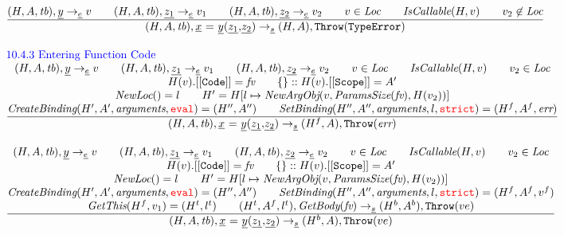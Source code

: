 \documentclass[a4paper, leqno]{amsart}
\newcommand{\rulesep}{\quad\quad}
\newcommand{\stmt}{s}
\newcommand{\expr}{e}
\newcommand{\ir}[1]{\ensuremath{\underline{#1}}}
\newcommand{\irid}{\ir{x}}
\def\inred{\color{red}}
\def\inblue{\color{blue}}
\newcommand{\strict}{{\inred\tt strict}}
\newcommand{\eval}{{\inred\tt eval}}
\newcommand{\tb}{\emph{tb}}
\newcommand{\err}{\emph{err}}
\newcommand{\te}{{\tt TypeError}}
\newcommand{\Loc}{\emph{Loc}}
\newcommand{\hf}[1]{\emph{#1}}
\newcommand{\error}{\ensuremath{{\tt Throw}(\err)}}
\newcommand{\thte}{\ensuremath{{\tt Throw}(\te)}}
\newcommand{\state}{\ensuremath{(H,A,\tb)}}
\newcommand{\res}{\ensuremath{(H,A)}}
\newcommand{\respp}{\ensuremath{(H'',A'')}}
\newcommand{\evale}{\ensuremath{(H,A,\tb)}}
\newcommand{\ircall}{\ensuremath{\irid \ {\tt =} \ \ir{y}{\tt(}\ir{z_1}{\tt,}\ir{z_2}{\tt)}}}
\def\inred{\color{red}}
\def\inblue{\color{blue}}
\begin{document}
\[\begin{array}{l@{~~}l@{~~}ll}
\frac{\begin{matrix}
\evale, \ir{y} \rightarrow_{\ir\expr} v
\rulesep
\evale, \ir{z_1} \rightarrow_{\ir\expr} v_1
\rulesep
\evale, \ir{z_2} \rightarrow_{\ir\expr} v_2
\rulesep
v \in \Loc
\rulesep
\hf{IsCallable}(H,v)
\rulesep
v_2 \not\in \Loc
\end{matrix}}{\begin{matrix}
\state, \ircall \rightarrow_{\ir\stmt}
\res, \thte
\end{matrix}}
\\[2em]

\mbox{\inblue 10.4.3 Entering Function Code}\\
\frac{\begin{matrix}
\evale, \ir{y} \rightarrow_{\ir\expr} v
\rulesep
\evale, \ir{z_1} \rightarrow_{\ir\expr} v_1
\rulesep
\evale, \ir{z_2} \rightarrow_{\ir\expr} v_2
\rulesep
v \in \Loc
\rulesep
\hf{IsCallable}(H,v)
\rulesep
v_2 \in \Loc
\\
H(v).{\tt[[Code]]} = \emph{fv}
\rulesep
\{\}::H(v).{\tt[[Scope]]} = A'
\\
\hf{NewLoc}() = l
\rulesep
H' = H[l\mapsto \hf{NewArgObj}(v, \hf{ParamsSize}(\emph{fv}), H(v_2))]
\\
\hf{CreateBinding}(H', A', \hf{arguments}, \eval) = \respp%
\rulesep
\hf{SetBinding}(H'', A'', \hf{arguments}, l, \strict) = (H^f, A^f, \err)%
\end{matrix}}{\begin{matrix}
\state, \ircall \rightarrow_{\ir\stmt}
(H^f, A), \error
\end{matrix}}
\\[2em]

\frac{\begin{matrix}
\evale, \ir{y} \rightarrow_{\ir\expr} v
\rulesep
\evale, \ir{z_1} \rightarrow_{\ir\expr} v_1
\rulesep
\evale, \ir{z_2} \rightarrow_{\ir\expr} v_2
\rulesep
v \in \Loc
\rulesep
\hf{IsCallable}(H,v)
\rulesep
v_2 \in \Loc
\\
H(v).{\tt[[Code]]} = \emph{fv}
\rulesep
\{\}::H(v).{\tt[[Scope]]} = A'
\\
\hf{NewLoc}() = l
\rulesep
H' = H[l\mapsto \hf{NewArgObj}(v, \hf{ParamsSize}(\emph{fv}), H(v_2))]
\\
\hf{CreateBinding}(H', A', \hf{arguments}, \eval) = \respp%
\rulesep
\hf{SetBinding}(H'', A'', \hf{arguments}, l, \strict) = (H^f, A^f, v^f)%
\\
\hf{GetThis}(H^f,v_1) = (H^t,l^t)
\rulesep
(H^t, A^f, l^t), \hf{GetBody}(\emph{fv}) \rightarrow_{\ir\stmt} (H^b, A^b), {\tt Throw}(ve)
\end{matrix}}{\begin{matrix}
\state, \ircall \rightarrow_{\ir\stmt}
(H^b, A), {\tt Throw}(ve)
\end{matrix}}
\\[2em]


\end{array}\]
\end{document}
